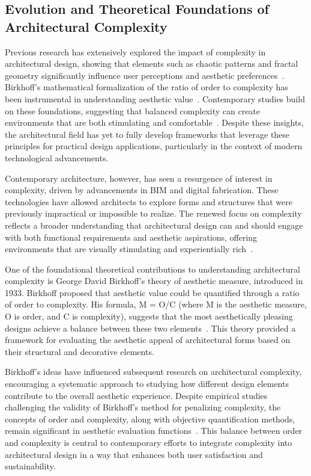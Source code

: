 \subsection{Evolution and Theoretical Foundations of Architectural Complexity}
\label{subsec:ComplexityStudies}

Previous research has extensively explored the impact of complexity in architectural design, showing that elements such as chaotic patterns and fractal geometry significantly influence user perceptions and aesthetic preferences~\cite{Bies2016}.
Birkhoff's mathematical formalization of the ratio of order to complexity has been instrumental in understanding aesthetic value~\cite{Douchova2016}.
Contemporary studies build on these foundations, suggesting that balanced complexity can create environments that are both stimulating and comfortable~\cite{Redies2015}.
Despite these insights, the architectural field has yet to fully develop frameworks that leverage these principles for practical design applications, particularly in the context of modern technological advancements.

Contemporary architecture, however, has seen a resurgence of interest in complexity, driven by advancements in BIM and digital fabrication.
These technologies have allowed architects to explore forms and structures that were previously impractical or impossible to realize.
The renewed focus on complexity reflects a broader understanding that architectural design can and should engage with both functional requirements and aesthetic aspirations, offering environments that are visually stimulating and experientially rich~\cite{Gage2015}.

One of the foundational theoretical contributions to understanding architectural complexity is George David Birkhoff's theory of aesthetic measure, introduced in 1933.
Birkhoff proposed that aesthetic value could be quantified through a ratio of order to complexity.
His formula, M = O/C (where M is the aesthetic measure, O is order, and C is complexity), suggests that the most aesthetically pleasing designs achieve a balance between these two elements~\cite{Douchova2016}.
This theory provided a framework for evaluating the aesthetic appeal of architectural forms based on their structural and decorative elements.

Birkhoff's ideas have influenced subsequent research on architectural complexity, encouraging a systematic approach to studying how different design elements contribute to the overall aesthetic experience.
Despite empirical studies challenging the validity of Birkhoff's method for penalizing complexity, the concepts of order and complexity, along with objective quantification methods, remain significant in aesthetic evaluation functions~\cite{Javaheri2016}.
This balance between order and complexity is central to contemporary efforts to integrate complexity into architectural design in a way that enhances both user satisfaction and sustainability.

